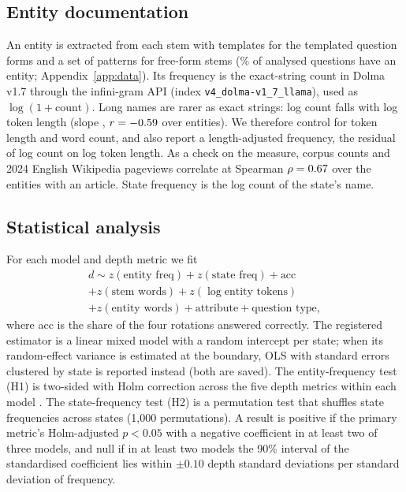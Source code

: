 \subsection{Entity documentation}

An entity is extracted from each stem with templates for the templated question forms and a set of patterns for free-form stems (\pctEntity\% of analysed questions have an entity; Appendix~\ref{app:data}).
Its frequency is the exact-string count in Dolma v1.7 through the infini-gram API (index \texttt{v4\_dolma-v1\_7\_llama}), used as $\log(1 + \text{count})$.
Long names are rarer as exact strings: log count falls with log token length (slope \lenSlope, $r = -0.59$ over \nEntities{} entities).
We therefore control for token length and word count, and also report a length-adjusted frequency, the residual of log count on log token length.
As a check on the measure, corpus counts and 2024 English Wikipedia pageviews correlate at Spearman $\rho = 0.67$ over the \nPageviews{} entities with an article.
State frequency is the log count of the state's name.

\subsection{Statistical analysis}

For each model and depth metric we fit
\begin{multline*}
d \sim z(\text{entity freq}) + z(\text{state freq}) + \text{acc} \\
+ z(\text{stem words}) + z(\log \text{entity tokens}) \\
+ z(\text{entity words}) + \text{attribute} + \text{question type},
\end{multline*}
where acc is the share of the four rotations answered correctly.
The registered estimator is a linear mixed model with a random intercept per state; when its random-effect variance is estimated at the boundary, OLS with standard errors clustered by state is reported instead (both are saved).
The entity-frequency test (H1) is two-sided with Holm correction across the five depth metrics within each model \citep{holm1979simple}.
The state-frequency test (H2) is a permutation test that shuffles state frequencies across states (1{,}000 permutations).
A result is positive if the primary metric's Holm-adjusted $p < 0.05$ with a negative coefficient in at least two of three models, and null if in at least two models the 90\% interval of the standardised coefficient lies within $\pm 0.10$ depth standard deviations per standard deviation of frequency.

